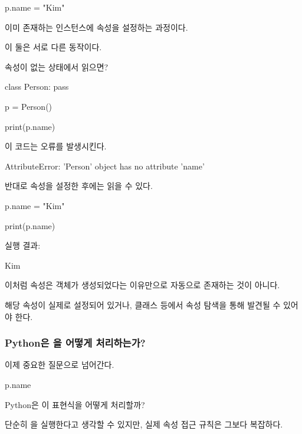 \begin{dhkcode}
p.name = "Kim"
\end{dhkcode}

이미 존재하는 인스턴스에 속성을 설정하는 과정이다.

이 둘은 서로 다른 동작이다.

\begin{dhknote}
\begin{dhksmry}[centered]
속성이 없는 상태에서 읽으면?
\end{dhksmry}
\end{dhknote}

\begin{dhkcode}
class Person:
    pass

p = Person()

print(p.name)
\end{dhkcode}

이 코드는 오류를 발생시킨다.

\begin{dhkzsh}
AttributeError: 'Person' object has no attribute 'name'
\end{dhkzsh}

반대로 속성을 설정한 후에는 읽을 수 있다.

\begin{dhkcode}
p.name = "Kim"

print(p.name)
\end{dhkcode}

실행 결과:

\begin{dhkzsh}
Kim
\end{dhkzsh}

이처럼 속성은 객체가 생성되었다는 이유만으로 자동으로 존재하는 것이 아니다.

해당 속성이 실제로 설정되어 있거나, 클래스 등에서 속성 탐색을 통해 발견될 수 있어야 한다.

\subsubsection{Python은 을 어떻게 처리하는가?}

이제 중요한 질문으로 넘어간다.

\begin{dhkcode}
p.name
\end{dhkcode}

Python은 이 표현식을 어떻게 처리할까?

단순히 을 실행한다고 생각할 수 있지만, 실제 속성 접근 규칙은 그보다 복잡하다.

